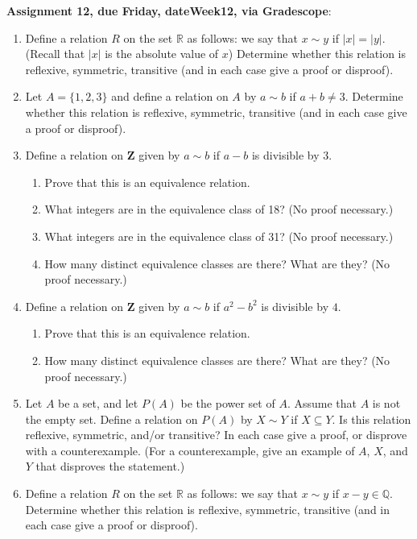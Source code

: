 \documentclass[12pt]{article}
\begin{document}
\noindent \textbf{Assignment 12, due Friday, \csname dateWeek12\endcsname, via Gradescope}:
\begin{enumerate}
\item Define a relation $R$ on the set $\mathbb{R}$ as follows: we say that $x \sim y$ if $|x| = |y|$. (Recall that $|x|$ is the absolute value of $x$) Determine whether this relation is reflexive, symmetric, transitive (and in each case give a proof or disproof).

\item Let $A = \{1,2,3\}$ and define a relation on $A$ by $a \sim b$ if $a + b \neq 3$. Determine whether this relation is reflexive, symmetric, transitive (and in each case give a proof or disproof).

\item Define a relation on $\mathbf{Z}$ given by $a \sim b$ if $a-b$ is divisible by $3$.
 \begin{enumerate}
 \item Prove that this is an equivalence relation.
 \item What integers are in the equivalence class of 18? (No proof necessary.)
 \item What integers are in the equivalence class of 31? (No proof necessary.) 
 \item How many distinct equivalence classes are there? What are they? (No proof necessary.)
 \end{enumerate}
\item Define a relation on $\mathbf{Z}$ given by $a \sim b$ if $a^2-b^2$ is divisible by $4$.
 \begin{enumerate}
 \item Prove that this is an equivalence relation.
 \item How many distinct equivalence classes are there? What are they? (No proof necessary.)
 \end{enumerate} 
\item Let $A$ be a set, and let $P(A)$ be the power set of $A$. Assume that $A$ is not the empty set. Define a relation on $P(A)$ by $X \sim Y$ if $X \subseteq Y$. Is this relation reflexive, symmetric, and/or transitive? In each case give a proof, or disprove with a counterexample. (For a counterexample, give an example of $A$, $X$, and $Y$ that disproves the statement.)

\item Define a relation $R$ on the set $\mathbb{R}$ as follows: we say that $x \sim y$ if $x - y \in \mathbb{Q}$. Determine whether this relation is reflexive, symmetric, transitive (and in each case give a proof or disproof).
  

\end{enumerate}
\end{document}
